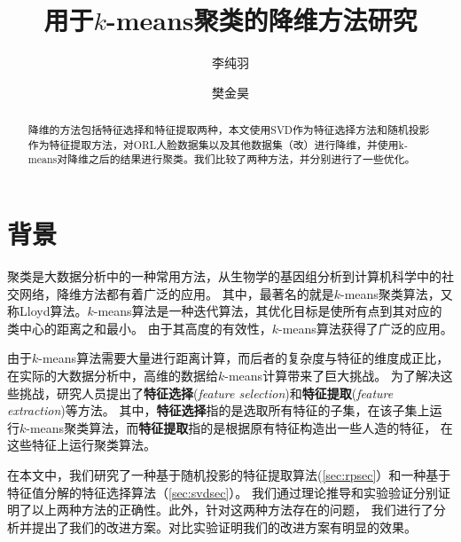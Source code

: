 \documentclass{ctexart}
\title{用于$k$-means聚类的降维方法研究}
\author{李纯羽 \and 樊金昊}
\begin{document}
    \maketitle

    \begin{abstract}
        降维的方法包括特征选择和特征提取两种，本文使用SVD作为特征选择方法和随机投影作为特征提取方法，对ORL人脸数据集以及其他数据集（改）进行降维，并使用k-means对降维之后的结果进行聚类。我们比较了两种方法，并分别进行了一些优化。
    \end{abstract}
    \tableofcontents
    \newpage

    \section{背景}
    聚类是大数据分析中的一种常用方法，从生物学的基因组分析到计算机科学中的社交网络，降维方法都有着广泛的应用\cite{Mahoney2009cur}。
    其中，最著名的就是$k$-means聚类算法，又称Lloyd算法。$k$-means算法是一种迭代算法，其优化目标是使所有点到其对应的类中心的距离之和最小\cite{blum2020foundations}。
    由于其高度的有效性，$k$-means算法获得了广泛的应用。

    由于$k$-means算法需要大量进行距离计算，而后者的复杂度与特征的维度成正比，在实际的大数据分析中，高维的数据给$k$-means计算带来了巨大挑战。
    为了解决这些挑战，研究人员提出了\textbf{特征选择}(\textit{feature selection})和\textbf{特征提取}(\textit{feature extraction})等方法。
    其中，\textbf{特征选择}指的是选取所有特征的子集，在该子集上运行$k$-means聚类算法，而\textbf{特征提取}指的是根据原有特征构造出一些人造的特征，
    在这些特征上运行聚类算法。

    在本文中，我们研究了一种基于随机投影的特征提取算法(\autoref{sec:rpsec}）和一种基于特征值分解的特征选择算法（\autoref{sec:svdsec}）。
    我们通过理论推导和实验验证分别证明了以上两种方法的正确性。此外，针对这两种方法存在的问题，
    我们进行了分析并提出了我们的改进方案。对比实验证明我们的改进方案有明显的效果。

    \begin{center}
    \end{center}
\end{document}
